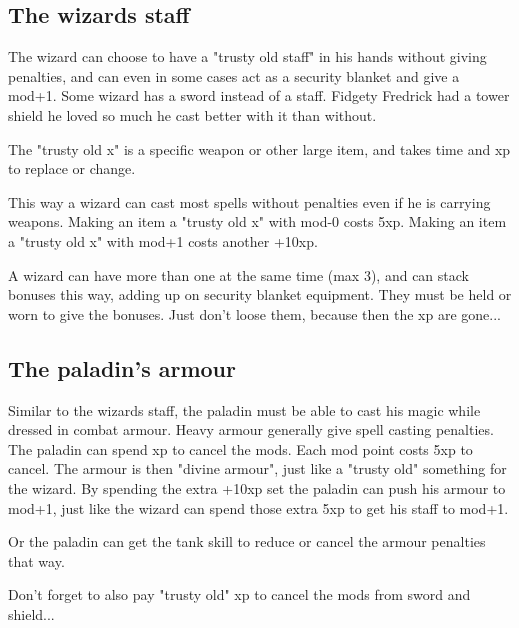 \subsection*{The wizards staff}
The wizard can choose to have a "trusty old staff" in his hands without giving penalties, and can even in some cases act as a security blanket and give a mod+1. Some wizard has a sword instead of a staff. Fidgety Fredrick had a tower shield he loved so much he cast better with it than without.

The "trusty old x" is a specific weapon or other large item, and takes time and xp to replace or change.

This way a wizard can cast most spells without penalties even if he is carrying weapons. Making an item a "trusty old x" with mod-0 costs 5xp. Making an item a "trusty old x" with mod+1 costs another +10xp.

A wizard can have more than one at the same time (max 3), and can stack bonuses this way, adding up on security blanket equipment. They must be held or worn to give the bonuses. Just don't loose them, because then the xp are gone...


\subsection*{The paladin's armour}
Similar to the wizards staff, the paladin must be able to cast his magic while dressed in combat armour. Heavy armour generally give spell casting penalties. The paladin can spend xp to cancel the mods. Each mod point costs 5xp to cancel. The armour is then "divine armour", just like a "trusty old" something for the wizard. By spending the extra +10xp set the paladin can push his armour to mod+1, just like the wizard can spend those extra 5xp to get his staff to mod+1.

Or the paladin can get the tank skill to reduce or cancel the armour penalties that way.

Don't forget to also pay "trusty old" xp to cancel the mods from sword and shield...


















